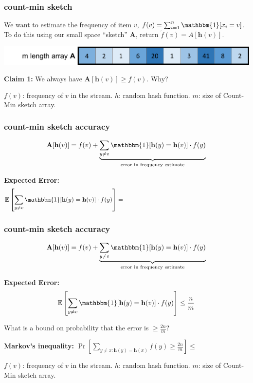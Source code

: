 \documentclass[]{beamer}
\newcommand{\bv}[1]{\mathbf{#1}}
\newcommand{\E}{\mathbb{E}}
\begin{document}
	\begin{frame}
		\frametitle{count-min sketch}
		We want to estimate the  frequency of item $v$, $f(v) = \sum_{i=1}^n \mathbbm{1}[x_i = v]$. To do this using our small space ``sketch'' $\bv{A}$, return  $\tilde{f}(v) = A[\bv{h}(v)]$.
		\vspace{.5em}
		
		\includegraphics[width=.85\textwidth]{cm5.png}
		
		\textbf{Claim 1:} We always have $\bv{A}[\bv{h}(v)] \ge f(v)$. \alert{Why?}
		
		\vspace{7em}
		\begin{block}{\vspace*{-3ex}}
			\small $f(v)$: frequency of $v$ in the stream. ${h}$: random hash function. $m$: size of Count-Min sketch array.
		\end{block}
	\end{frame}
	
	\begin{frame}
		\frametitle{count-min sketch accuracy}
		\begin{align*}
			\bv{A}[\bv{h}(v)] = f(v) + \underbrace{\sum_{y  \neq v} \mathbbm{1}[\bv h(y) = \bv{h}(v)]\cdot f(y)}_{\text{error in frequency estimate}}
		\end{align*}
		
		\vspace{-2em}
		\small
		\textbf{Expected Error:} 
		\begin{align*}
			\E \left [ \sum_{y  \neq v } \mathbbm{1}[\bv h(y) = \bv{h}(v)]\cdot f(y) \right ] = \hspace{20em}
		\end{align*}
		
	\end{frame}
	
	\begin{frame}
		\frametitle{count-min sketch accuracy}
		\begin{align*}
			\bv{A}[\bv{h}(v)] = f(v) + \underbrace{\sum_{y  \neq v} \mathbbm{1}[\bv h(y) = \bv{h}(v)]\cdot f(y)}_{\text{error in frequency estimate}}
		\end{align*}
		
		\textbf{Expected Error:} 
		\begin{align*}
			\E \left [ \sum_{y  \neq v} \mathbbm{1}[\bv h(y) = \bv{h}(v)]\cdot f(y) \right ] \leq \frac{n}{m}
		\end{align*}
		
		\alert{What is a bound on probability that the error is $\ge \frac{2n}{m}$?}
		
		\smallskip
		\textbf{Markov's inequality:} $\Pr \left [  \sum_{y  \neq x: \bv h(y) = \bv{h}(x)} f(y) \ge \frac{2n}{m}\right ] \le $
		
		\begin{block}{\vspace*{-3ex}}
			\small $f(v)$: frequency of $v$ in the stream. ${h}$: random hash function. $m$: size of Count-Min sketch array.
		\end{block}
	\end{frame}
	
\end{document}
